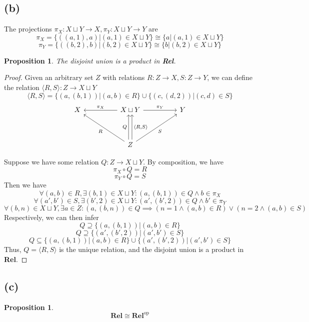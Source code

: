 \documentclass[11pt]{article} %
\newtheorem{proposition}[theorem]{Proposition}
\theoremstyle{definition}
\begin{document}
\subsection*{(b)}
The projections $\pi_X: X\sqcup Y \rightarrow X, \pi_Y:X\sqcup Y \rightarrow Y$ are
\[\pi_X = \{((a,1),a)|(a,1) \in X\sqcup Y\}\cong \{a|(a,1) \in X\sqcup Y\}\]
\[\pi_Y = \{((b,2),b)|(b,2) \in X\sqcup Y\}\cong \{b|(b,2) \in X\sqcup Y\}\]
\begin{proposition}
  The disjoint union is a product in \textbf{Rel}.
\end{proposition}
\begin{proof}
  Given an arbitrary set $Z$ with relations $R:Z\rightarrow X, S:Z\rightarrow Y$,
  we can define the relation $\langle R, S \rangle: Z\rightarrow X\sqcup Y$
  \[\langle R, S \rangle = \{(a,(b,1))|(a,b)\in R\} \cup \{(c,(d,2))|(c,d)\in S\}\]
\[\begin{tikzcd}
	X && {X\sqcup Y} && Y \\
	\\
	&& Z
	\arrow["{\langle R,S\rangle}"', shift right, from=3-3, to=1-3]
	\arrow["S"', from=3-3, to=1-5]
	\arrow["{\pi_Y}", from=1-3, to=1-5]
	\arrow["R", from=3-3, to=1-1]
	\arrow["{\pi_X}"', from=1-3, to=1-1]
	\arrow["Q", shift left, from=3-3, to=1-3]
\end{tikzcd}\]

  Suppose we have some relation $Q:Z\rightarrow X\sqcup Y$. By composition, we have
  \[\pi_X \circ Q = R\]
  \[\pi_Y \circ Q = S\]
  Then we have
  \[\forall (a,b)\in R, \exists (b,1)\in X\sqcup Y:(a,(b,1))\in Q \wedge b\in \pi_X\]
  \[\forall (a',b')\in S, \exists (b',2)\in X\sqcup Y:(a',(b',2))\in Q \wedge b'\in \pi_Y\]
  \[\forall (b,n)\in X\sqcup Y, \exists a\in Z:(a,(b,n))\in Q 
  \implies (n=1 \wedge (a,b)\in R) \vee (n=2 \wedge (a,b) \in S)\]
  Respectively, we can then infer
  \[Q\supseteq \{(a,(b,1))|(a,b)\in R\}\]
  \[Q\supseteq \{(a',(b',2))|(a',b')\in S\}\]
  \[Q\subseteq \{(a,(b,1))|(a,b)\in R\} \cup \{(a',(b',2))|(a',b')\in S\}\]
  Thus, $Q=\langle R, S \rangle$ is the unique relation, and the disjoint union is a product in \textbf{Rel}.
\end{proof}

\subsection*{(c)}
\begin{proposition}
  \[\textbf{Rel}\cong\textbf{Rel}^{\text{op}}\]
\end{proposition}
\end{document}
